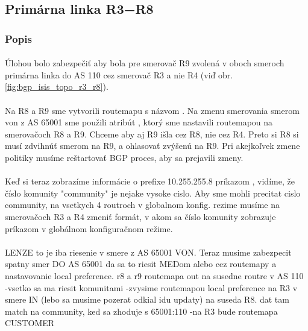 \documentclass[12pt,twoside,a4paper]{report}
\begin{document}
\subsection{Primárna linka R3−R8}
\subsubsection{Popis}
\paragraph{}
Úlohou bolo zabezpečiť aby bola pre smerovač R9 zvolená v oboch smeroch primárna linka do AS 110 cez smerovač R3 a nie R4 (viď obr. \ref{fig:bgp_isis_topo_r3_r8}). 

\paragraph{}
Na R8 a R9 sme vytvorili routemapu s názvom . Na zmenu smerovania smerom von z AS 65001 sme použili atribút , ktorý sme nastavili routemapou na smerovačoch R8 a R9. Chceme aby aj R9 išla cez R8, nie cez R4. Preto si R8 si musí zdvihnúť  smerom na R9, a ohlasovať zvýšenú  na R9. Pri akejkoľvek zmene politiky musíme reštartovať BGP proces, aby sa prejavili zmeny.

\paragraph{}
Keď si teraz zobrazíme informácie o prefixe 10.255.255.8 príkazom , vidíme, že číslo komunity "community" je nejake vysoke cislo. Aby sme mohli precitat cislo community, na vsetkych 4 routroch v globalnom konfig. rezime musíme na smerovačoch R3 a R4 zmeniť formát, v akom sa číslo komunity zobrazuje príkazom  v globálnom konfiguračnom režime.

\paragraph{}
LENZE to je iba riesenie v smere z AS 65001 VON. Teraz musime zabezpecit spatny smer DO AS 65001
da sa to riesit MEDom alebo cez routemapy a nastavovanie local preference.
r8 a r9 routemapa out na susedne routre v AS 110
-vsetko sa ma riesit komunitami
-zvysime routemapou local preference na R3 v smere IN (lebo sa musime pozerat odkial idu updaty) na suseda R8. dat tam match na community, ked sa zhoduje s 65001:110
-na R3 bude routemapa CUSTOMER
\end{document}
